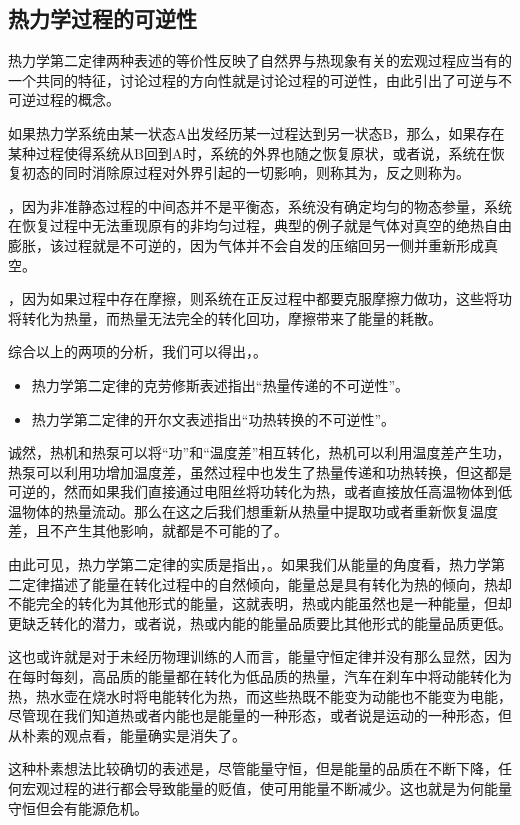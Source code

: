 \subsection{热力学过程的可逆性}
热力学第二定律两种表述的等价性反映了自然界与热现象有关的宏观过程应当有的一个共同的特征，讨论过程的方向性就是讨论过程的可逆性，由此引出了可逆与不可逆过程的概念。
\begin{BoxDefinition}[可逆过程]
    如果热力学系统由某一状态A出发经历某一过程达到另一状态B，那么，如果存在某种过程使得系统从B回到A时，系统的外界也随之恢复原状，或者说，系统在恢复初态的同时消除原过程对外界引起的一切影响，则称其为，反之则称为。
\end{BoxDefinition}

，因为非准静态过程的中间态并不是平衡态，系统没有确定均匀的物态参量，系统在恢复过程中无法重现原有的非均匀过程，典型的例子就是气体对真空的绝热自由膨胀，该过程就是不可逆的，因为气体并不会自发的压缩回另一侧并重新形成真空。

，因为如果过程中存在摩擦，则系统在正反过程中都要克服摩擦力做功，这些将功将转化为热量，而热量无法完全的转化回功，摩擦带来了能量的耗散。

综合以上的两项的分析，我们可以得出，。

\begin{itemize}
    \item 热力学第二定律的克劳修斯表述指出“热量传递的不可逆性”。
    \item 热力学第二定律的开尔文表述指出“功热转换的不可逆性”。
\end{itemize}

诚然，热机和热泵可以将“功”和“温度差”相互转化，热机可以利用温度差产生功，热泵可以利用功增加温度差，虽然过程中也发生了热量传递和功热转换，但这都是可逆的，然而如果我们直接通过电阻丝将功转化为热，或者直接放任高温物体到低温物体的热量流动。那么在这之后我们想重新从热量中提取功或者重新恢复温度差，且不产生其他影响，就都是不可能的了。

由此可见，热力学第二定律的实质是指出，。如果我们从能量的角度看，热力学第二定律描述了能量在转化过程中的自然倾向，能量总是具有转化为热的倾向，热却不能完全的转化为其他形式的能量，这就表明，热或内能虽然也是一种能量，但却更缺乏转化的潜力，或者说，热或内能的能量品质要比其他形式的能量品质更低。

这也或许就是对于未经历物理训练的人而言，能量守恒定律并没有那么显然，因为在每时每刻，高品质的能量都在转化为低品质的热量，汽车在刹车中将动能转化为热，热水壶在烧水时将电能转化为热，而这些热既不能变为动能也不能变为电能，尽管现在我们知道热或者内能也是能量的一种形态，或者说是运动的一种形态，但从朴素的观点看，能量确实是消失了。

这种朴素想法比较确切的表述是，尽管能量守恒，但是能量的品质在不断下降，任何宏观过程的进行都会导致能量的贬值，使可用能量不断减少。这也就是为何能量守恒但会有能源危机。




